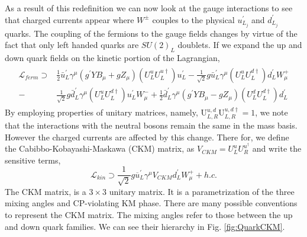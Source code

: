 As a result of this redefinition we can now look at the gauge interactions to see that charged currents appear where $W^\pm$ couples to the physical $u^\prime_{L_j}$ and $d^\prime_{L_j}$ quarks. 
%
The coupling of the fermions to the gauge fields changes by virtue of the fact that only left handed quarks are $SU(2)_L$ doublets. If we expand the up and down quark fields on the kinetic portion of the Lagrangian,
%
\begin{align}
\label{LagFermFCCCs}
\begin{split}
\mathcal{L}_{ferm} \supset & 
\frac{1}{2} \bar{u}^\prime_L \gamma^\mu \left( g^\prime Y B_\mu + g Z_\mu  \right) \left(U^u_L U^{u \dagger}_L \right) u^\prime_L - \frac{1}{\sqrt{2}} g \bar{u}^\prime_L \gamma^\mu \left( U^u_L U^{d \dagger}_L \right) d^\prime_L W^+_\mu \\ \nonumber   
- 
& \frac{1}{\sqrt{2}} g \bar{d}^\prime_L \gamma^\mu \left( U^u_L U^{d \dagger}_L \right) u^\prime_L W^-_\mu 
+ 
\frac{1}{2} \bar{d}^\prime_L \gamma^\mu \left( g^\prime Y B_\mu - g Z_\mu \right) \left( U^d_L U^{d \dagger}_L \right) d^\prime_L  
\end{split}
\end{align}
%
By employing properties of unitary matrices, namely, $ \mathrm{U}^{u,d}_{L,R} \mathrm{U}^{u,d \dagger}_{L,R} = 1$, we note that the interactions with the neutral bosons remain the same in the mass basis.
%
However the charged currents are affected by this change.
%
There for, we define the Cabibbo-Kobayashi-Maskawa (CKM) matrix, as $V_{CKM} = U^u_L U^{u ^\dagger }_R $ and write the sensitive terms,
%
\begin{equation}
\mathcal{L}_{kin} \supset \frac{1}{\sqrt{2}} g \overline{u}^\prime_L \gamma^\mu V_{CKM} d_L^\prime W^+_\mu + h.c. 
\end{equation}
%
The CKM matrix, is a $3 \times 3$ unitary matrix. It is a parametrization of the three mixing angles and CP-violating KM phase. There are many possible conventions to represent the CKM matrix.
%
The mixing angles refer to those between the up and down quark families. We can see their hierarchy in Fig. \ref{fig:QuarkCKM}.

